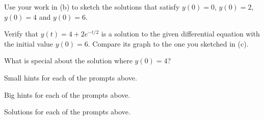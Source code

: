 \begin{activity}
\item  Use your work in (b) to sketch the solutions that satisfy $y(0) = 0$, $y(0) = 2$, $y(0) = 4$ 
  and $y(0) = 6.$

\item  Verify that $y(t) = 4 + 2e^{-t/2}$ is a solution to the given
  differential equation with the initial value $y(0) = 6.$  Compare
  its graph to the one you sketched in (c).

\item  What is special about the solution where $y(0) = 4$?  

\ea
\end{activity}
\begin{smallhint}
\ba
	\item Small hints for each of the prompts above.
\ea
\end{smallhint}
\begin{bighint}
\ba
	\item Big hints for each of the prompts above.
\ea
\end{bighint}
\begin{activitySolution}
\ba
	\item Solutions for each of the prompts above.
\ea
\end{activitySolution}
\aftera